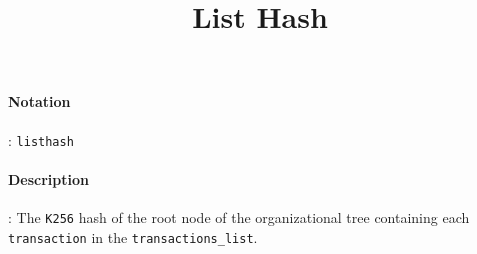 \documentclass[10pt,a4paper,oneside]{scrartcl}
\author{}
\title{List Hash}
\date{}
\begin{document}
\maketitle
\paragraph{Notation}: \texttt{listhash}
\paragraph{Description}: The \texttt{K256} hash of the root node of the organizational tree containing each \texttt{transaction} in the \texttt{transactions\_list}.

\printbibliography
\end{document}
